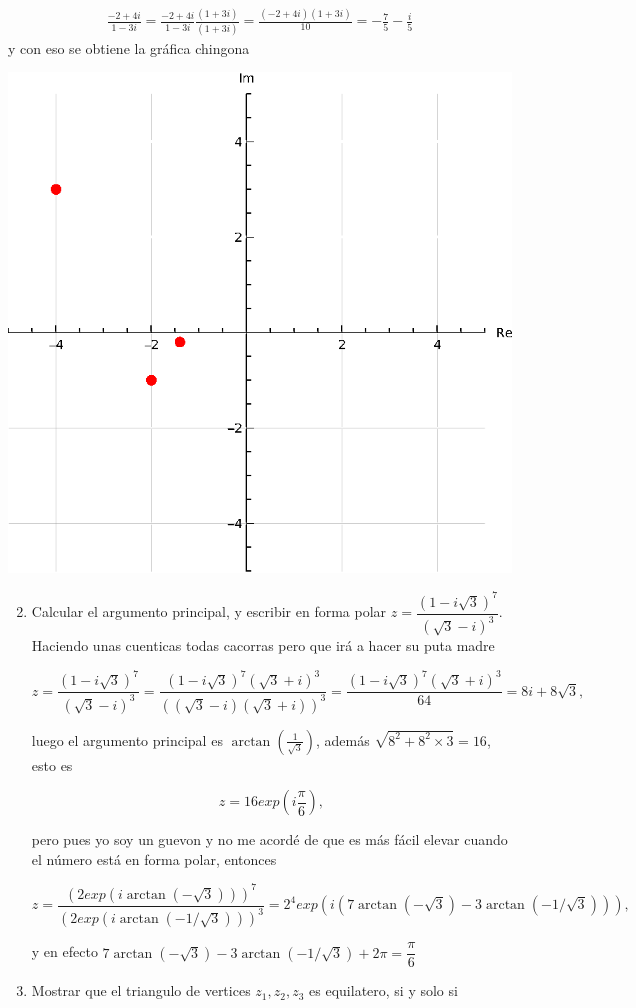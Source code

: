 \documentclass[11pt]{article}
\begin{document}
\begin{align*}
  \frac{-2+4 i}{1-3 i}=\frac{-2+4 i}{1-3 i}\frac{(1+3i)}{(1+3i)}=\frac{(-2+4i)(1+3i)}{10}=-\frac{7}{5}-\frac{i}{5}
\end{align*}
y con eso se obtiene la gráfica chingona
\begin{center}
\includegraphics[scale=0.8]{Graphics/Punto1.eps}
\end{center}

\begin{enumerate}
  \setcounter{enumi}{1}
  \item Calcular el argumento principal, y escribir en forma polar $z=\dfrac{(1-i \sqrt{3})^{7}}{(\sqrt{3}-i)^{3}}$.\\

Haciendo unas cuenticas todas cacorras pero que irá a hacer su puta madre

$$z = \frac{(1 - i \sqrt{3})^7}{(\sqrt{3} - i)^3} = \frac{(1 - i \sqrt{3})^7 (\sqrt{3} + i)^3}{((\sqrt{3} - i)(\sqrt{3} + i))^3} = \frac{(1 - i \sqrt{3})^7 (\sqrt{3} + i)^3}{64} = 8i + 8\sqrt{3},
$$

luego el argumento principal es $\arctan\left(\displaystyle\frac{1}{\sqrt{3}}\right)$, además $\sqrt{8^2+8^2\times 3}=16$, esto es

$$z=16exp\left(i\frac{\pi}{6}\right),$$

pero pues yo soy un guevon y no me acordé de que es más fácil elevar cuando el número está en forma polar, entonces

$$z=\frac{(2exp(i\arctan(-\sqrt{3})))^7}{(2exp(i\arctan(-1/\sqrt{3})))^3}=2^4exp(i(7\arctan(-\sqrt{3})-3\arctan(-1/\sqrt{3}))),$$
 
 y en efecto $7\arctan(-\sqrt{3})-3\arctan(-1/\sqrt{3})+2\pi=\dfrac{\pi}{6}$

  \item Mostrar que el triangulo de vertices $z_{1}, z_{2}, z_{3}$ es equilatero, si y solo si
\end{enumerate}
\end{document}

